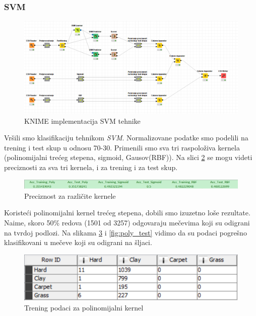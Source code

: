 \documentclass[a4paper]{article}
\begin{document}
\subsubsection{SVM}

\begin{figure}[h!]
	\begin{center}
		\includegraphics[scale=0.30]{KNIME_project/SVM/SVM_knime}
	\end{center}
	\caption{KNIME implementacija SVM tehnike}
	\label{fig:KNIME_CvoroviKlasifikacija}
\end{figure}

Vršili smo klasifikaciju tehnikom \textit{SVM}. Normalizovane podatke smo podelili na trening i test skup u odnosu 70-30.
Primenili smo sva tri raspoloživa kernela (polinomijalni trećeg stepena, sigmoid, Gausov(RBF)).
Na slici \ref{fig:precision} se mogu videti preciznosti za sva tri kernela, i za trening i za test skup.

\begin{figure}[h!]
	\begin{center}
		\includegraphics[scale=0.45]{KNIME_project/SVM/preciznost}
	\end{center}
	\caption{Preciznost za različite kernele}
	\label{fig:precision}
\end{figure}


Koristeći polinomijalni kernel trećeg stepena, dobili smo izuzetno loše rezultate.
Naime, skoro 50\% redova (1501 od 3257) odgovaraju mečevima koji su odigrani na tvrdoj podlozi.
Na slikama \ref{fig:poly_training} i \ref{fig:poly_test} vidimo da su podaci pogrešno klasifikovani u
mečeve koji su odigrani na šljaci.

\begin{figure}[h!]
	\begin{center}
		\includegraphics[scale=0.80]{KNIME_project/SVM/poly_training}
	\end{center}
	\caption{Trening podaci za polinomijalni kernel}
	\label{fig:poly_training}
\end{figure}
\end{document}
